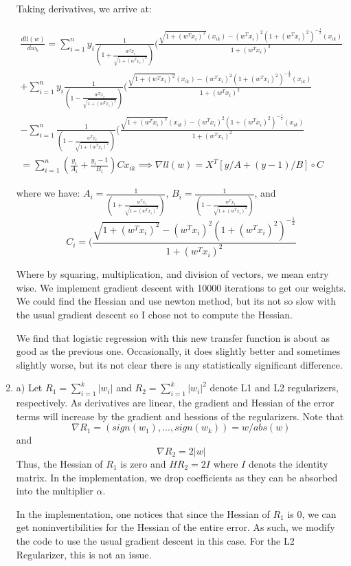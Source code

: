 \documentclass[12pt]{article}
\theoremstyle{plain}
\theoremstyle{definition}
\begin{document}
\begin{enumerate}
Taking derivatives, we arrive at:

\begin{align*}
\frac{dll(w)}{dw_k} = \sum_{i=1}^n y_i \frac{1}{(1 + \frac{w^Tx_i}{\sqrt{1+(w^Tx_i)^2}})} (\frac{\sqrt{1+(w^Tx_i)^2}(x_{ik}) - (w^Tx_i)^2(1+(w^Tx_i)^2)^{-\frac{1}{2}} (x_{ik})  }{1+(w^Tx_i)^2}
\\
+ \sum_{i=1}^n y_i \frac{1}{(1 - \frac{w^Tx_i}{\sqrt{1+(w^Tx_i)^2}})} (\frac{\sqrt{1+(w^Tx_i)^2}(x_{ik}) - (w^Tx_i)^2(1+(w^Tx_i)^2)^{-\frac{1}{2}} (x_{ik})  }{1+(w^Tx_i)^2}
\\
- \sum_{i=1}^n \frac{1}{(1 - \frac{w^Tx_i}{\sqrt{1+(w^Tx_i)^2}})} (\frac{\sqrt{1+(w^Tx_i)^2}(x_{ik}) - (w^Tx_i)^2(1+(w^Tx_i)^2)^{-\frac{1}{2}} (x_{ik})  }{1+(w^Tx_i)^2}
\\
= \sum_{i=1}^n (\frac{y_i}{A_i} + \frac{y_i-1}{B_i})C x_{ik}
\implies \nabla ll(w) = X^T[y/A + (y-1)/B] \circ C 
\end{align*}

where we have:
 $A_i = \frac{1}{(1 + \frac{w^Tx_i}{\sqrt{1+(w^Tx_i)^2}})}$, $B_i = \frac{1}{(1 - \frac{w^Tx_i}{\sqrt{1+(w^Tx_i)^2}})} $, and 
 $$C_i = (\frac{\sqrt{1+(w^Tx_i)^2} - (w^Tx_i)^2(1+(w^Tx_i)^2)^{-\frac{1}{2}}}{1+(w^Tx_i)^2}$$

Where by squaring, multiplication, and division of vectors, we mean entry wise. We implement gradient descent with 10000 iterations to get our weights. We could find the Hessian and use newton method, but its not so slow with the usual gradient descent so I chose not to compute the Hessian.

We find that logistic regression with this new transfer function is about as good as the previous one. Occasionally, it does slightly better and sometimes slightly worse, but its not clear there is any statistically significant difference. 


\item

a) Let $R_1 = \sum_{i=1}^k |w_i|$ and $R_2 = \sum_{i=1}^k |w_i|^2$ denote L1 and L2 regularizers, respectively. As derivatives are linear, the gradient and Hessian of the error terms will increase by the gradient and hessions of the regularizers. Note that $$\nabla R_1 = (sign(w_1), ..., sign(w_k)) = w/abs(w)$$ and $$\nabla R_2 = 2|w|$$ Thus, the Hessian of $R_1$ is zero and $HR_2 = 2I$ where $I$ denots the identity matrix. In the implementation, we drop coefficients as they can be absorbed into the multiplier $\alpha$.

In the implementation, one notices that since the Hessian of $R_1$ is 0, we can get noninvertibilities for the Hessian of the entire error. As such, we modify the code to use the usual gradient descent in this case. For the L2 Regularizer, this is not an issue. 


\end{enumerate}
\end{document}
